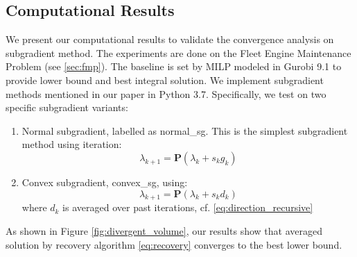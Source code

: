 \documentclass[../main]{subfiles}
\begin{document}









\subsection{Computational Results}\label{dual.computational-results}

We present our computational results to validate the convergence analysis on subgradient method.
The experiments are done on the Fleet Engine Maintenance Problem (see \ref{sec:fmp}).
The baseline is set by MILP modeled in Gurobi 9.1 to provide lower bound and best integral solution.
We implement subgradient methods mentioned in our paper in Python 3.7. Specifically, we test on two specific subgradient variants:

\begin{enumerate}
  \item Normal subgradient, labelled as \textsf{normal\_sg}. This is the simplest subgradient method using iteration:
        \[\lambda_{k+1} = \mathbf{P}(\lambda_{k} + s_{k}g_{k})\]
  \item Convex subgradient, \textsf{convex\_sg}, using:
        \[\lambda_{k+1} = \mathbf{P}(\lambda_{k} + s_{k}d_{k})\]
        where \(d_k\) is averaged over past iterations, cf. \eqref{eq:direction_recursive}
\end{enumerate}

As shown in Figure \ref{fig:divergent_volume}, our results show that averaged solution by recovery algorithm \eqref{eq:recovery} converges to the best lower bound.
\end{document}
